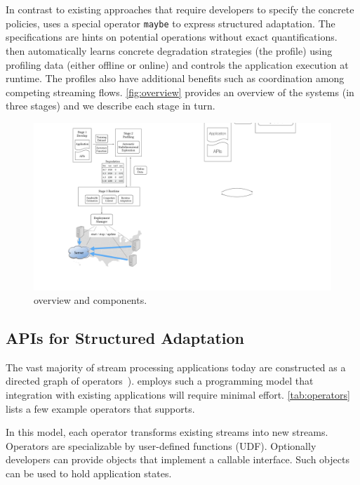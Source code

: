 \section{\sysname{}}
\label{sec:system}

In contrast to existing approaches that require developers to specify the
concrete policies, \sysname{} uses a special operator \texttt{maybe} to express
structured adaptation. The specifications are hints on potential operations
without exact quantifications. \sysname{} then automatically learns concrete
degradation strategies (the profile) using profiling data (either offline or
online) and controls the application execution at runtime. The profiles also
have additional benefits such as coordination among competing streaming
flows. \autoref{fig:overview} provides an overview of the systems (in three
stages) and we describe each stage in turn.

\begin{figure}
  \centering
  \includegraphics[width=.9\linewidth]{figures/system.pdf}
  \caption{\sysname{} overview and components.}
  \label{fig:overview}
\end{figure}

\subsection{APIs for Structured Adaptation}
\label{sec:struct-adapt}

The vast majority of stream processing applications today are constructed as a
directed graph of operators~\cite{toshniwal2014storm, zaharia2013discretized}).
\sysname{} employs such a programming model that integration with existing
applications will require minimal effort. \autoref{tab:operators} lists a few
example operators that \sysname{} supports.

In this model, each operator transforms existing streams into new
streams. Operators are specializable by user-defined functions (UDF). Optionally
developers can provide objects that implement a callable interface. Such objects
can be used to hold application states.

